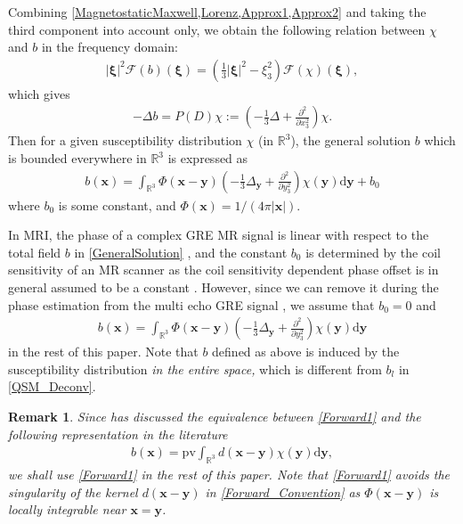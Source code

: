 \documentclass[reqno]{siamonline1116}
\numberwithin{theorem}{section}
\numberwithin{equation}{section}
\newtheorem{remark}[theorem]{Remark}
\def\R{{\mathbb R}}
\def\pv{\mathrm{pv}}
\def\rd{\mathrm{d}}
\def\f{\frac}
\def\p{\partial}
\def\x{\boldsymbol{x}}
\def\y{{\boldsymbol y}}
\def\msF{{\mathscr F}}
\def\pv{\mathrm{pv}}
\def\xxi{{\boldsymbol{\xi}}}
\begin{document}
Combining \cref{MagnetostaticMaxwell,Lorenz,Approx1,Approx2} and taking the third component into account only, we obtain the following relation between $\chi$ and $b$ in the frequency domain:
\begin{align}\label{QSM_Fou2}
|\xxi|^2\msF(b)(\xxi)=\left(\f{1}{3}|\xxi|^2-\xi_3^2\right)\msF(\chi)(\xxi),
\end{align}
which gives
\begin{align}\label{QSM_PDE2}
-\Delta b=P(D)\chi:=\left(-\f{1}{3}\Delta+\f{\p^2}{\p x_3^2}\right)\chi.
\end{align}
Then for a given susceptibility distribution $\chi$ (in $\R^3$), the general solution $b$ which is bounded everywhere in $\R^3$ is expressed as
\begin{align}\label{GeneralSolution}
b(\x)=\int_{\R^3}\Phi(\x-\y)\left(-\f{1}{3}\Delta_{\y}+\f{\p^2}{\p y_3^2}\right)\chi(\y)\rd\y+b_0
\end{align}
where $b_0$ is some constant, and $\Phi(\x)=1/\left(4\pi|\x|\right)$.

In MRI, the phase of a complex GRE MR signal is linear with respect to the total field $b$ in \cref{GeneralSolution} \cite{Y.Wang2015}, and the constant $b_0$ is determined by the coil sensitivity of an MR scanner as the coil sensitivity dependent phase offset is in general assumed to be a constant \cite{E.M.Haacke2015,F.Schweser2016}. However, since we can remove it during the phase estimation from the multi echo GRE signal \cite{L.deRochefort2008}, we assume that $b_0=0$ and
\begin{align}\label{Forward1}
b(\x)=\int_{\R^3}\Phi(\x-\y)\left(-\f{1}{3}\Delta_{\y}+\f{\p^2}{\p y_3^2}\right)\chi(\y)\rd\y
\end{align}
in the rest of this paper. Note that $b$ defined as above is induced by the susceptibility distribution \emph{in the entire space,} which is different from $b_l$ in \cref{QSM_Deconv}.

\begin{remark}\label{RK211}
Since \cite[Proposition A.1.]{J.K.Choi2014} has discussed the equivalence between \cref{Forward1} and the following representation in the literature
\begin{align}\label{Forward_Convention}
b(\x)=\pv\int_{\R^3}d(\x-\y)\chi(\y)\rd\y,
\end{align}
we shall use \cref{Forward1} in the rest of this paper. Note that \cref{Forward1} avoids the singularity of the kernel $d(\x-\y)$ in \cref{Forward_Convention} as $\Phi(\x-\y)$ is locally integrable near $\x=\y$.
\end{remark}
\end{document}

